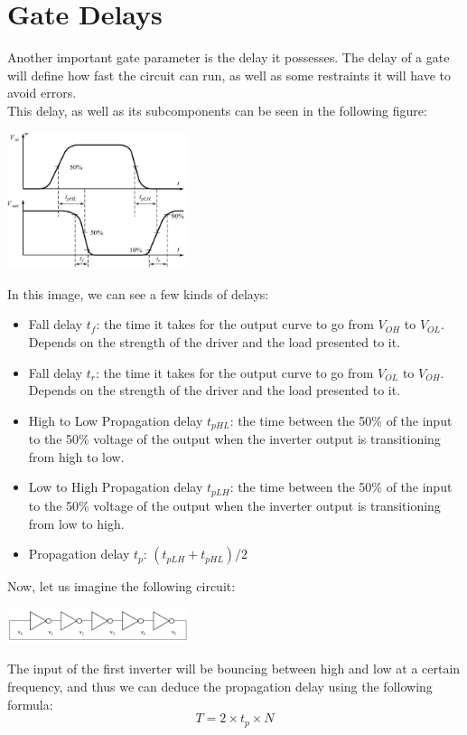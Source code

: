\documentclass[nobib]{tufte-handout}
\begin{document}
\section{Gate Delays}
Another important gate parameter is the delay it possesses.  The delay of a gate will define how fast the circuit can run, as well as some restraints it will have to avoid errors.\\
This delay, as well as its subcomponents can be seen in the following figure:
\begin{center}
    \includegraphics*[width = 200px]{images/inverter_delay_plot.png}
\end{center}
In this image, we can see a few kinds of delays:
\begin{itemize}
    \item Fall delay $t_f$: the time it takes for the output curve to go from $V_{OH}$ to $V_{OL}$. Depends on the strength of the driver and the load presented to it.
    \item Fall delay $t_r$: the time it takes for the output curve to go from $V_{OL}$ to $V_{OH}$. Depends on the strength of the driver and the load presented to it.
    \item High to Low Propagation delay $t_{pHL}$: the time between the 50\% of the input to the 50\% voltage of the output when the inverter output is transitioning from high to low.
    \item Low to High Propagation delay $t_{pLH}$: the time between the 50\% of the input to the 50\% voltage of the output when the inverter output is transitioning from low to high.
    \item Propagation delay $t_p$: $(t_{pLH}+t_{pHL})/2$
\end{itemize}
Now, let us imagine the following circuit:
\begin{center}
    \includegraphics*[width = 200px]{images/inverter_cycle.png}
\end{center}
The input of the first inverter will be bouncing between high and low at a certain frequency, and thus we can deduce the propagation delay using the following formula:
\begin{equation*}
    T = 2 \times t_p \times N
\end{equation*}
\end{document}
